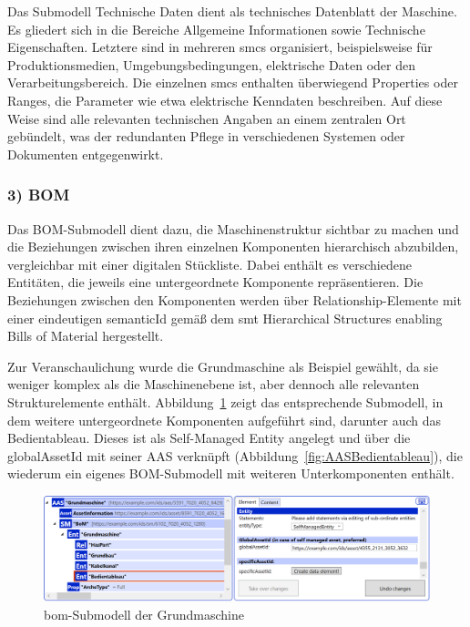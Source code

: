 Das Submodell Technische Daten dient als technisches Datenblatt der Maschine.  
Es gliedert sich in die Bereiche Allgemeine Informationen sowie Technische Eigenschaften. 
Letztere sind in mehreren \acsp{smc} organisiert, beispielsweise für Produktionsmedien, Umgebungsbedingungen, elektrische Daten oder den Verarbeitungsbereich. 
Die einzelnen \acsp{smc} enthalten überwiegend Properties oder Ranges, die Parameter wie etwa elektrische Kenndaten beschreiben. 
Auf diese Weise sind alle relevanten technischen Angaben an einem zentralen Ort gebündelt, was der redundanten Pflege in verschiedenen Systemen oder Dokumenten entgegenwirkt. 

\subsubsection*{3) BOM}
\vspace{-0.5em}

Das BOM-Submodell dient dazu, die Maschinenstruktur sichtbar zu machen und die Beziehungen zwischen ihren einzelnen Komponenten hierarchisch abzubilden, vergleichbar mit einer digitalen Stückliste.
Dabei enthält es verschiedene Entitäten, die jeweils eine untergeordnete Komponente repräsentieren.
Die Beziehungen zwischen den Komponenten werden über Relationship-Elemente mit einer eindeutigen semanticId gemäß dem \acs{smt} Hierarchical Structures enabling Bills of Material \cite{SpezifikationHierachischeStrukturen} hergestellt.

Zur Veranschaulichung wurde die Grundmaschine als Beispiel gewählt, da sie weniger komplex als die Maschinenebene ist, aber dennoch alle relevanten Strukturelemente enthält.
Abbildung~\ref{fig:BOMSubmodelGrundmashcine} zeigt das entsprechende Submodell, in dem weitere untergeordnete Komponenten aufgeführt sind, darunter auch das Bedientableau.
Dieses ist als Self-Managed Entity angelegt und über die globalAssetId mit seiner AAS verknüpft (Abbildung~\ref{fig:AASBedientableau}), die wiederum ein eigenes BOM-Submodell mit weiteren Unterkomponenten enthält.

\begin{figure}[htbp]
    \centering
        \includegraphics[width=1\textwidth]{Bilder/ErgebnissePackageExplorer/AASGrundmaschine.PNG}
    \caption{\acs{bom}-Submodell der Grundmaschine}
    \label{fig:BOMSubmodelGrundmashcine}
\end{figure}

